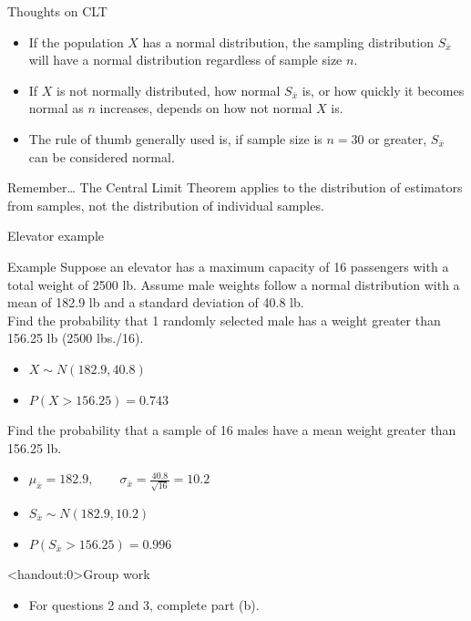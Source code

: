 \documentclass[xcolor=table, handout]{beamer}
\begin{document}
\begin{frame}{Thoughts on CLT}
\begin{block}{}
\large
\begin{itemize}
\item If the population $X$ has a normal distribution, the sampling distribution $S_{\bar x}$ will have a normal distribution regardless of sample size $n$.
\pause\item If $X$ is not normally distributed, how normal $S_{\bar x}$ is, or how quickly it becomes normal as $n$ increases, depends on how not normal $X$ is.
\pause\item The rule of thumb generally used is, if sample size is $n=30$ or greater, $S_{\bar x}$ can be considered normal.
\end{itemize}

\end{block}

\pause
\begin{alertblock}{Remember\ldots}
The Central Limit Theorem applies to the distribution of estimators from samples, not the distribution of individual samples.
\end{alertblock}
\end{frame}

\begin{frame}{Elevator example}
\begin{exampleblock}{Example}
Suppose an elevator has a maximum capacity of 16 passengers with a total weight of 2500 lb. Assume male weights follow a normal distribution with a mean of 182.9 lb and a standard deviation of 40.8 lb. \\
\medskip
Find the probability that 1 randomly selected male has a weight greater than 156.25 lb (2500 lbs./16).
\begin{itemize}
\pause\item $X \sim N(182.9, 40.8)$
\pause\item $P( X > 156.25) = 0.743$
\end{itemize}
\pause\medskip
Find the probability that a sample of 16 males have a mean weight greater than 156.25 lb. 
\begin{itemize}
\pause\item $\mu_{\bar x} = 182.9, \qquad \sigma_{\bar x} = \frac {40.8}{\sqrt{16}} = 10.2$
\pause\item $S_{\bar x} \sim N(182.9, 10.2)$
\pause\item $P(S_{\bar x} > 156.25) = 0.996$
\end{itemize}
\end{exampleblock}
\end{frame}

\begin{frame}<handout:0>{Group work}
\begin{block}{}
\large
\begin{itemize}
\item For questions 2 and 3, complete part (b).
\end{itemize}
\end{block}
\end{frame}
\end{document}
